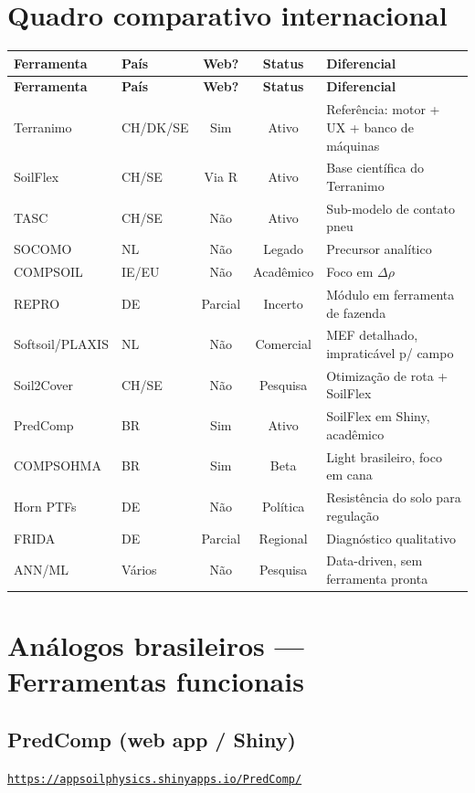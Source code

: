 \documentclass[12pt,a4paper]{article}
\newcommand{\Section}[1]{\needspace{12\baselineskip}\section{#1}}
\newcommand{\SubsectionKeep}[1]{\needspace{10\baselineskip}\subsection{#1}}
\newcommand{\Link}[1]{\href{#1}{\nolinkurl{#1}}}
\begin{document}
\Section{Quadro comparativo internacional}

\begin{longtable}{>{\raggedright}p{2.8cm} >{\raggedright}p{1.4cm} c c >{\raggedright\arraybackslash}p{3.6cm}}
\toprule
\textbf{Ferramenta} & \textbf{País} & \textbf{Web?} & \textbf{Status} & \textbf{Diferencial} \\
\midrule
\endfirsthead
\toprule
\textbf{Ferramenta} & \textbf{País} & \textbf{Web?} & \textbf{Status} & \textbf{Diferencial} \\
\midrule
\endhead
\bottomrule
\endfoot
Terranimo        & CH/DK/SE & Sim  & Ativo       & Referência: motor + UX + banco de máquinas \\
SoilFlex         & CH/SE    & Via R & Ativo      & Base científica do Terranimo \\
TASC             & CH/SE    & Não  & Ativo       & Sub-modelo de contato pneu \\
SOCOMO           & NL       & Não  & Legado      & Precursor analítico \\
COMPSOIL         & IE/EU    & Não  & Acadêmico   & Foco em $\Delta\rho$ \\
REPRO            & DE       & Parcial & Incerto  & Módulo em ferramenta de fazenda \\
Softsoil/PLAXIS  & NL       & Não  & Comercial   & MEF detalhado, impraticável p/ campo \\
Soil2Cover       & CH/SE    & Não  & Pesquisa    & Otimização de rota + SoilFlex \\
PredComp         & BR       & Sim  & Ativo       & SoilFlex em Shiny, acadêmico \\
COMPSOHMA        & BR       & Sim  & Beta        & Light brasileiro, foco em cana \\
Horn PTFs        & DE       & Não  & Política    & Resistência do solo para regulação \\
FRIDA            & DE       & Parcial & Regional & Diagnóstico qualitativo \\
ANN/ML           & Vários   & Não  & Pesquisa    & Data-driven, sem ferramenta pronta \\
\end{longtable}

\Section{Análogos brasileiros --- Ferramentas funcionais}

\SubsectionKeep{PredComp (web app / Shiny)}
\Link{https://appsoilphysics.shinyapps.io/PredComp/}
\end{document}
